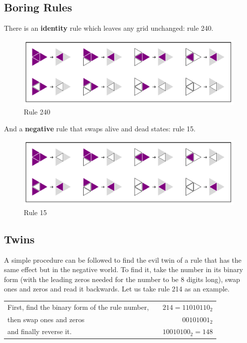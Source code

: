 \documentclass{article}
\begin{document}
\pagebreak
\subsection{Boring Rules} \label{boring-rules}
\noindent There is an \textbf{identity} rule which leaves any grid unchanged: rule 240.
\begin{figure}[H]
    \centering
        \includegraphics[width=.5\textwidth]{graphics/behavior/boring-rules/rule-240.pdf}
    \caption{Rule 240}
    \label{fig:rule-plot-240}
\end{figure}

\noindent And a \textbf{negative} rule that swaps alive and dead states: rule 15.
\begin{figure}[H]
    \centering
        \includegraphics[width=.5\textwidth]{graphics/behavior/boring-rules/rule-15.pdf}
    \caption{Rule 15}
    \label{fig:rule-plot-1(}
\end{figure}

\subsection{Twins} \label{twins}
A simple procedure can be followed to find the evil twin of a rule that has the same effect but in the negative world. To find it, take the number in its binary form (with the leading zeros needed for the number to be 8 digits long), swap ones and zeros and read it backwards. Let us take rule 214 as an example. \\

\begin{tabular}{l c r}
     First, find the binary form of the rule number, 
     & & $214=11010110_2$ \\
     then swap ones and zeros
     & & $00101001_2$ \\
     and finally reverse it.
     & & $10010100_2=148$
\end{tabular}
\end{document}
